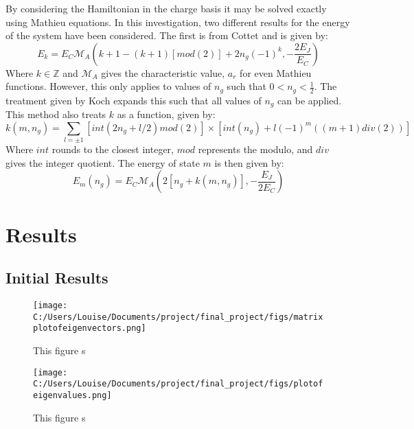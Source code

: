 \documentclass[11pt]{article}
\begin{document}
By considering the Hamiltonian in the charge basis it may be solved exactly using Mathieu equations. In this investigation, two different results for the energy of the system have been considered. The first is from Cottet and is given by:
\begin{equation} \label{eq:7}
E_k = E_C \mathcal{M}_A (k+1 - (k+1)[mod(2)] + 2n_g(-1)^k, -\frac{2E_J}{E_C})
\end{equation}
Where $k \in \mathbb{Z}$ and $\mathcal{M}_A$ gives the characteristic value, $a_r$ for even Mathieu functions. However, this only applies to values of $n_g$ such that $0 < n_g < \frac{1}{2}$. The treatment given by Koch expands this such that all values of $n_g$ can be applied. This method also treats $k$ as a function, given by:
\begin{equation} \label{eq:8}
k(m, n_g) = \sum_{l=\pm 1} [int(2n_g + l/2)mod(2)] \times [int(n_g) + l(-1)^m ((m+1)div(2))]
\end{equation}
Where $int$ rounds to the closest integer, $mod$ represents the modulo, and $div$ gives the integer quotient.  The energy of state $m$ is then given by:
\begin{equation} \label{eq:9}
E_m(n_g) = E_C \mathcal{M}_A (2[n_g + k(m,n_g)],-\frac{E_J}{2E_C})
\end{equation}


\section{Results}
\subsection{Initial Results}
\begin{figure}
\centering
\texttt{[image: C:/Users/Louise/Documents/project/final\_project/figs/matrixplotofeigenvectors.png]}
\caption{This figure s}
\label{fig:graph1}
\end{figure}

\begin{figure}
\centering
\texttt{[image: C:/Users/Louise/Documents/project/final\_project/figs/plotofeigenvalues.png]}
\caption{This figure s}
\label{fig:graph2}
\end{figure}
\end{document}
